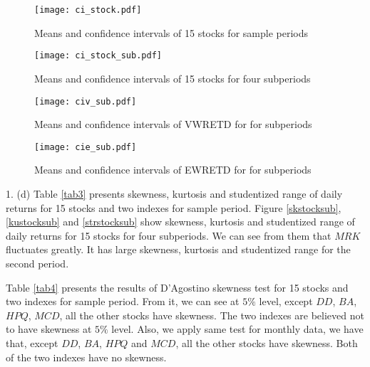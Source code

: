 \documentclass[11pt]{article}
\begin{document}
\begin{figure}
\centering
\texttt{[image: ci\_stock.pdf]}
\caption{Means and confidence intervals of 15 stocks for sample periods}
\label{cis}
\end{figure}

\begin{figure}
\centering
\texttt{[image: ci\_stock\_sub.pdf]}
\caption{Means and confidence intervals of 15 stocks for four subperiods}
\label{cissub}
\end{figure}

\begin{figure}
\centering
\texttt{[image: civ\_sub.pdf]}
\caption{Means and confidence intervals of VWRETD for for subperiods}
\label{cisv}
\end{figure}

\begin{figure}
\centering
\texttt{[image: cie\_sub.pdf]}
\caption{Means and confidence intervals of EWRETD for for subperiods}
\label{cise}
\end{figure}

1. (d)
 Table \ref{tab3} presents skewness, kurtosis and studentized range of daily returns for 15 stocks and two indexes for sample period. Figure \ref{skstocksub}, \ref{kustocksub} and \ref{strstocksub} show skewness, kurtosis and studentized range of daily returns for 15 stocks for four subperiods. We can see from them that $MRK$ fluctuates greatly. It has large skewness, kurtosis and studentized range for the second period.

Table \ref{tab4} presents the results of D'Agostino skewness test for 15 stocks and two indexes for sample period. From it, we can see at $5\%$ level, except $DD$, $BA$, $HPQ$, $MCD$, all the other stocks have skewness. The two indexes are believed not to have skewness at $5\%$ level. Also, we apply same test for monthly data, we have that, except $DD$, $BA$, $HPQ$ and $MCD$, all the other stocks have skewness. Both of the two indexes have no skewness.
\end{document}
